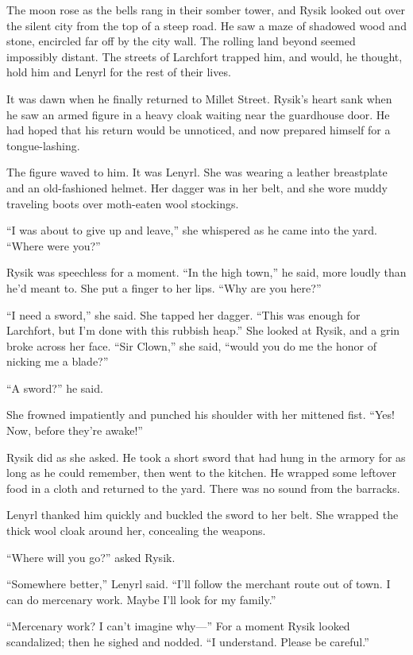 \documentclass[10pt,a4paper]{article}
\begin{document}
The moon rose as the bells rang in their somber tower, and Rysik
looked out over the silent city from the top of a steep road. He
saw a maze of shadowed wood and stone, encircled far off by the
city wall. The rolling land beyond seemed impossibly distant.
The streets of Larchfort trapped him, and would, he thought, hold
him and Lenyrl for the rest of their lives.

It was dawn when he finally returned to Millet Street. Rysik's heart
sank when he saw an armed figure in a heavy cloak waiting near the
guardhouse door. He had hoped that his return would be unnoticed,
and now prepared himself for a tongue-lashing.

The figure waved to him. It was Lenyrl. She was wearing a leather
breastplate and an old-fashioned helmet. Her dagger was in her belt,
and she wore muddy traveling boots over moth-eaten wool stockings.

``I was about to give up and leave,'' she whispered as he came into
the yard. ``Where were you?''

Rysik was speechless for a moment. ``In the high town,'' he said,
more loudly than he'd meant to. She put a finger to her lips.
``Why are you here?''

``I need a sword,'' she said. She tapped her dagger. ``This was enough
for Larchfort, but I'm done with this rubbish heap.'' She looked
at Rysik, and a grin broke across her face. ``Sir Clown,'' she said,
``would you do me the honor of nicking me a blade?''

``A sword?'' he said.

She frowned impatiently and punched his shoulder with her mittened
fist. ``Yes! Now, before they're awake!''

Rysik did as she asked. He took a short sword that had hung in
the armory for as long as he could remember, then went to the
kitchen. He wrapped some leftover food in a cloth and returned to
the yard. There was no sound from the barracks.

Lenyrl thanked him quickly and buckled the sword to her belt. She
wrapped the thick wool cloak around her, concealing the weapons.

``Where will you go?'' asked Rysik.

``Somewhere better,'' Lenyrl said. ``I'll follow the merchant route
out of town. I can do mercenary work. Maybe I'll look for my family.''

``Mercenary work? I can't imagine why---'' For a moment Rysik looked
scandalized; then he sighed and nodded. ``I understand. Please
be careful.''
\end{document}
